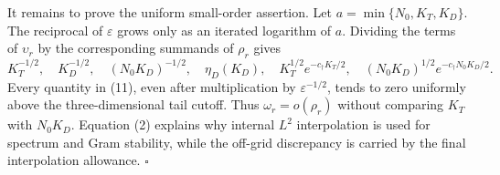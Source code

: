 It remains to prove the uniform small-order assertion. Let \(a=\min\{N_0,K_T,K_D\}\). The reciprocal of \(\varepsilon\) grows only as an iterated logarithm of \(a\). Dividing the terms of \(\upsilon_r\) by the corresponding summands of \(\rho_r\) gives
\[
 K_T^{-1/2},\quad K_D^{-1/2},\quad (N_0K_D)^{-1/2},\quad
 \eta_D(K_D),\quad
 K_T^{1/2}e^{-c_\dagger K_T/2},\quad
 (N_0K_D)^{1/2}e^{-c_\dagger N_0K_D/2}.                 \tag{11}
\]
Every quantity in (11), even after multiplication by \(\varepsilon^{-1/2}\), tends to zero uniformly above the three-dimensional tail cutoff. Thus \(\omega_r=o(\rho_r)\) without comparing \(K_T\) with \(N_0K_D\). Equation (2) explains why internal \(L^2\) interpolation is used for spectrum and Gram stability, while the off-grid discrepancy is carried by the final interpolation allowance. \(\square\)